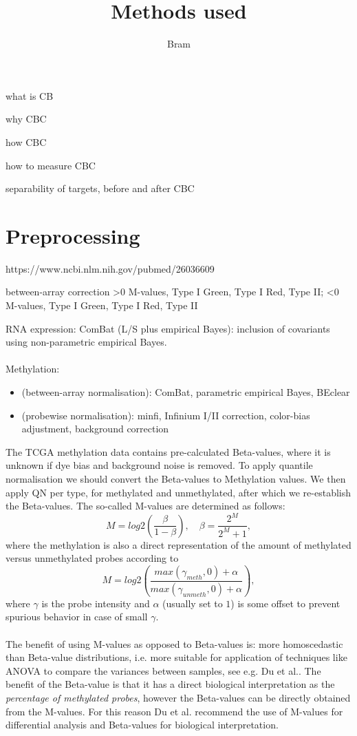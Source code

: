\documentclass[a4paper,10pt]{article}
\title{Methods used}
\author{Bram}
\begin{document}
what is CB

why CBC

how CBC

how to measure CBC

separability of targets, before and after CBC

\section{Preprocessing}
%

https://www.ncbi.nlm.nih.gov/pubmed/26036609

between-array correction 
>0 M-values, Type I Green, Type I Red, Type II;
<0 M-values, Type I Green, Type I Red, Type II 

RNA expression: ComBat (L/S plus empirical Bayes): inclusion of covariants using non-parametric empirical Bayes. \\ \\
%
Methylation:
\begin{itemize}
 \item (between-array normalisation): ComBat, parametric empirical Bayes, BEclear
 \item (probewise normalisation): minfi, Infinium I/II correction, color-bias adjustment, background correction
\end{itemize}
%

The TCGA methylation data contains pre-calculated Beta-values, where it is unknown if dye bias and background noise is removed. 
To apply quantile normalisation we should convert the Beta-values to Methylation values. We then apply QN per type, for methylated and unmethylated, after which we re-establish the Beta-values.
%
The so-called M-values are determined as follows:
\begin{equation}
 M  = log2\left({\frac{\beta}{1-\beta}}\right), \quad \beta = \frac{2^M}{2^M+1},
\end{equation}
%
where the methylation is also a direct representation of the amount of methylated versus unmethylated probes according to
\begin{equation}
 M  = log2\left({\frac{max(\gamma_{meth},0)+\alpha}{max(\gamma_{unmeth},0)+\alpha}}\right),
\end{equation}
%
where $\gamma$ is the probe intensity and $\alpha$ (usually set to $1$) is some offset to prevent spurious behavior in case of small $\gamma$. \\ \\
%
The benefit of using M-values as opposed to Beta-values is: 
more homoscedastic than Beta-value distributions, i.e. more suitable for application of techniques
like ANOVA to compare the variances between samples, see e.g. Du et al.\cite{Du2010}.
%
The benefit of the Beta-value is that it has a direct biological interpretation as the \textit{percentage of methylated probes}, however the Beta-values can be directly obtained from the M-values. For this reason Du et al.\cite{Du2010} recommend the use of M-values for differential analysis and Beta-values for biological interpretation. 
%
\end{document}
